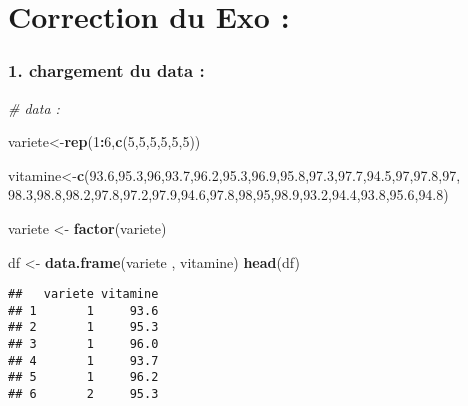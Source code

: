\documentclass[
]{article}
\author{}
\date{\vspace{-2.5em}}
\newenvironment{Shaded}{\begin{snugshade}}{\end{snugshade}}
\newcommand{\CommentTok}[1]{\textcolor[rgb]{0.56,0.35,0.01}{\textit{#1}}}
\newcommand{\DecValTok}[1]{\textcolor[rgb]{0.00,0.00,0.81}{#1}}
\newcommand{\FloatTok}[1]{\textcolor[rgb]{0.00,0.00,0.81}{#1}}
\newcommand{\FunctionTok}[1]{\textcolor[rgb]{0.13,0.29,0.53}{\textbf{#1}}}
\newcommand{\NormalTok}[1]{#1}
\newcommand{\OtherTok}[1]{\textcolor[rgb]{0.56,0.35,0.01}{#1}}
\newcommand{\SpecialCharTok}[1]{\textcolor[rgb]{0.81,0.36,0.00}{\textbf{#1}}}
\begin{document}
\hypertarget{correction-du-exo}{%
\section{Correction du Exo :}\label{correction-du-exo}}

\hypertarget{chargement-du-data}{%
\subsubsection{1. chargement du data :}\label{chargement-du-data}}

\begin{Shaded}
\begin{Highlighting}[]
\CommentTok{\# data :}

\NormalTok{variete}\OtherTok{\textless{}{-}}\FunctionTok{rep}\NormalTok{(}\DecValTok{1}\SpecialCharTok{:}\DecValTok{6}\NormalTok{,}\FunctionTok{c}\NormalTok{(}\DecValTok{5}\NormalTok{,}\DecValTok{5}\NormalTok{,}\DecValTok{5}\NormalTok{,}\DecValTok{5}\NormalTok{,}\DecValTok{5}\NormalTok{,}\DecValTok{5}\NormalTok{))}

\NormalTok{vitamine}\OtherTok{\textless{}{-}}\FunctionTok{c}\NormalTok{(}\FloatTok{93.6}\NormalTok{,}\FloatTok{95.3}\NormalTok{,}\DecValTok{96}\NormalTok{,}\FloatTok{93.7}\NormalTok{,}\FloatTok{96.2}\NormalTok{,}\FloatTok{95.3}\NormalTok{,}\FloatTok{96.9}\NormalTok{,}\FloatTok{95.8}\NormalTok{,}\FloatTok{97.3}\NormalTok{,}\FloatTok{97.7}\NormalTok{,}\FloatTok{94.5}\NormalTok{,}\DecValTok{97}\NormalTok{,}\FloatTok{97.8}\NormalTok{,}\DecValTok{97}\NormalTok{,}
            \FloatTok{98.3}\NormalTok{,}\FloatTok{98.8}\NormalTok{,}\FloatTok{98.2}\NormalTok{,}\FloatTok{97.8}\NormalTok{,}\FloatTok{97.2}\NormalTok{,}\FloatTok{97.9}\NormalTok{,}\FloatTok{94.6}\NormalTok{,}\FloatTok{97.8}\NormalTok{,}\DecValTok{98}\NormalTok{,}\DecValTok{95}\NormalTok{,}\FloatTok{98.9}\NormalTok{,}\FloatTok{93.2}\NormalTok{,}\FloatTok{94.4}\NormalTok{,}\FloatTok{93.8}\NormalTok{,}\FloatTok{95.6}\NormalTok{,}\FloatTok{94.8}\NormalTok{)}

\NormalTok{variete }\OtherTok{\textless{}{-}} \FunctionTok{factor}\NormalTok{(variete)}

\NormalTok{df }\OtherTok{\textless{}{-}} \FunctionTok{data.frame}\NormalTok{(variete , vitamine)}
\FunctionTok{head}\NormalTok{(df)}
\end{Highlighting}
\end{Shaded}

\begin{verbatim}
##   variete vitamine
## 1       1     93.6
## 2       1     95.3
## 3       1     96.0
## 4       1     93.7
## 5       1     96.2
## 6       2     95.3
\end{verbatim}
\end{document}

